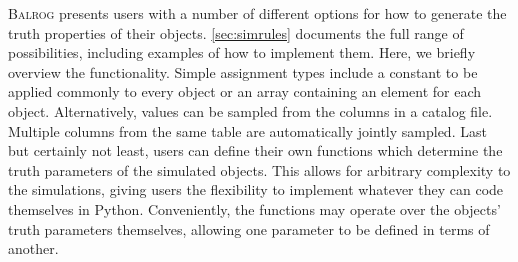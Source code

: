 \documentclass[11pt]{book}
\newcommand{\py}{Python}
\newcommand{\balrog}{\textsc{Balrog}}
\begin{document}
\balrog{} presents users with a number of different options for how to generate the truth properties of their objects.
\autoref{sec:simrules} documents the full range of possibilities, including examples of how to implement them.
Here, we briefly overview the functionality.
Simple assignment types include a constant to be applied commonly to every object or an array containing an element for each object.
Alternatively, values can be sampled from the columns in a catalog file. 
Multiple columns from the same table are automatically jointly sampled.
Last but certainly not least, users can define their own functions which determine the truth parameters of the simulated objects.
This allows for arbitrary complexity to the simulations, 
giving users the flexibility to implement whatever they can code themselves in \py{}.
Conveniently, the functions may operate over the objects' truth parameters themselves, 
allowing one parameter to be defined in terms of another.

\end{document}
